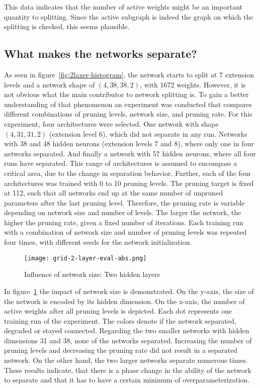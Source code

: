 This data indicates that the number of active weights might be an important quantity to splitting.
Since the active subgraph is indeed the graph on which the splitting is checked, this seems plausible.
 
\subsection{What makes the networks separate?}
As seen in figure~\ref{fig:2laxer-histogram}, the network starts to split at 7 extension levels and a network shape of $(4,38,38,2)$, with 1672 weights.
However, it is not obvious what the main contributor to network splitting is.
To gain a better understanding of that phenomenon an experiment was conducted that compares different combinations of pruning levels, network size, and pruning rate.
For this experiment, four architectures were selected.
One network with shape $(4,31,31,2)$ (extension level 6), which did not separate in any run.
Networks with 38 and 48 hidden neurons (extension levels 7 and 8), where only one in four networks separated.
And finally a network with 57 hidden neurons, where all four runs have separated.
This range of architectures is assumed to encompass a critical area, due to the change in separation behavior.
Further, each of the four architectures was trained with 0 to 10 pruning levels.
The pruning target is fixed at 112, such that all networks end up at the same number of unpruned parameters after the last pruning level.
Therefore, the pruning rate is variable depending on network size and number of levels.
The larger the network, the higher the pruning rate, given a fixed number of iterations.
Each training run with a combination of network size and number of pruning levels was repeated four times, with different seeds for the network initialization.

\begin{figure}[ht]
    \centering
    \texttt{[image: grid-2-layer-eval-abs.png]}
    \caption{Influence of network size: Two hidden layers}\label{fig:grid-1}
\end{figure}

In figure~\ref{fig:grid-1} the impact of network size is demonstrated.
On the y-axis, the size of the network is encoded by its hidden dimension.
On the x-axis, the number of active weights after all pruning levels is depicted.
Each dot represents one training run of the experiment.
The colors denote if the network separated, degraded or stayed connected.
Regarding the two smaller networks with hidden dimensions 31 and 38, none of the networks separated. 
Increasing the number of pruning levels and decreasing the pruning rate did not result in a separated network.
On the other hand, the two larger networks separate numerous times.
These results indicate, that there is a phase change in the ability of the network to separate and that it has to have a certain minimum of overparameterization.


